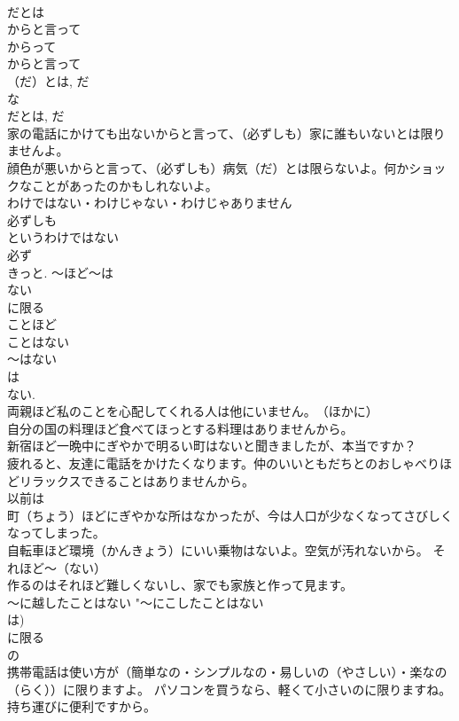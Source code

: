 \documentclass[8pt]{extreport}
\begin{document}
\begin{CJK}{UTF8}{min}
\\	だとは 
\\	からと言って 
\\	からって 
\\	からと言って 
\\	（だ）とは, だ 
\\	な
\\	だとは, だ 
\\	家の電話にかけても出ないからと言って、（必ずしも）家に誰もいないとは限りませんよ。 
\\	顔色が悪いからと言って、（必ずしも）病気（だ）とは限らないよ。何かショックなことがあったのかもしれないよ。 
\\	わけではない・わけじゃない・わけじゃありません 
\\	必ずしも
\\	というわけではない 
\\	必ず 
\\	きっと. ～ほど～は
\\	ない 
\\	に限る 
\\	ことほど
\\	ことはない 
\\	～はない 
\\	は 
\\	ない. 
\\	両親ほど私のことを心配してくれる人は他にいません。　（ほかに） 
\\	自分の国の料理ほど食べてほっとする料理はありませんから。 
\\	新宿ほど一晩中にぎやかで明るい町はないと聞きましたが、本当ですか？ 
\\	疲れると、友達に電話をかけたくなります。仲のいいともだちとのおしゃべりほどリラックスできることはありませんから。 
\\	以前は
\\	町（ちょう）ほどにぎやかな所はなかったが、今は人口が少なくなってさびしくなってしまった。 
\\	自転車ほど環境（かんきょう）にいい乗物はないよ。空気が汚れないから。 それほど～（ない） 
\\	作るのはそれほど難しくないし、家でも家族と作って見ます。 
\\	～に越したことはない	"～にこしたことはない 
\\	は)
\\	に限る 
\\	の 
\\	携帯電話は使い方が（簡単なの・シンプルなの・易しいの（やさしい）・楽なの（らく））に限りますよ。 パソコンを買うなら、軽くて小さいのに限りますね。持ち運びに便利ですから。 

\end{CJK}
\end{document}
